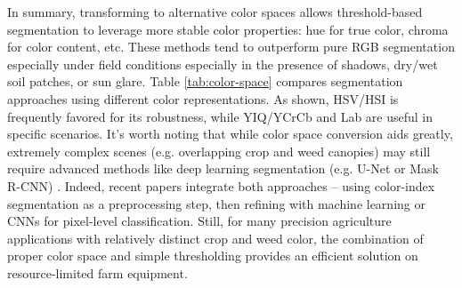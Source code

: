 \documentclass[letterpaper]{report}
\begin{document}
%
In summary, transforming to alternative color spaces allows threshold-based segmentation to leverage more stable color properties: hue for true color, chroma for color content, etc. These methods tend to outperform pure RGB segmentation especially under field conditions especially in the presence of shadows, dry/wet soil patches, or sun glare. Table \ref{tab:color-space} compares segmentation approaches using different color representations. As shown, HSV/HSI is frequently favored for its robustness, while YIQ/YCrCb and Lab are useful in specific scenarios. It’s worth noting that while color space conversion aids greatly, extremely complex scenes (e.g. overlapping crop and weed canopies) may still require advanced methods like deep learning segmentation (e.g. U-Net or Mask R-CNN) \parencite{Wu2021-gt}. Indeed, recent papers integrate both approaches – using color-index segmentation as a preprocessing step, then refining with machine learning or CNNs for pixel-level classification. Still, for many precision agriculture applications with relatively distinct crop and weed color, the combination of proper color space and simple thresholding provides an efficient solution on resource-limited farm equipment.
%
\end{document}
